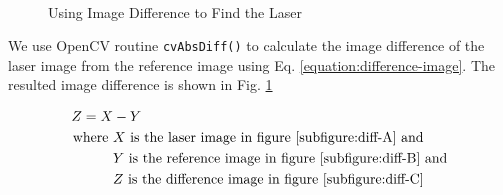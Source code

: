 \begin{figure}[ht!]
\centering
{} \hfill
{} \\
 \hfill
\caption{Using Image Difference to Find the Laser}
\label{figure:difference-image}
\end{figure}

We use OpenCV routine \texttt{cvAbsDiff()} to calculate the image difference
of the laser image from the reference image using Eq.
\ref{equation:difference-image}. The resulted image difference is shown in
Fig. \ref{figure:difference-image}

\begin{align}
\label{equation:difference-image}
Z = X &- Y \\
\text{where}~
&X~ \text{is the laser image in figure \ref{subfigure:diff-A} and} \notag \\
&Y~ \text{is the reference image in figure \ref{subfigure:diff-B} and} \notag \\
&Z~ \text{is the difference image in figure \ref{subfigure:diff-C}} \notag
\end{align}

